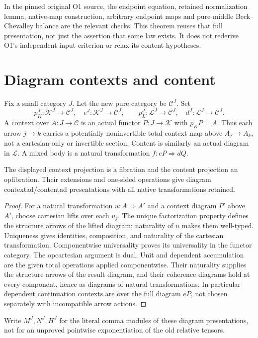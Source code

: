 \documentclass[11pt]{article}
\begin{document}
In the pinned original O1 source, the endpoint equation, retained normalization lemma, native-map construction, arbitrary endpoint maps and pure-middle Beck--Chevalley balance are the relevant checks. This theorem reuses that full presentation, not just the assertion that some law exists. It does not rederive O1's independent-input criterion or relax its content hypotheses.

\section{Diagram contexts and content}
Fix a small category $J$. Let the new pure category be $\mathcal C^J$. Set
\[
 p_K^J:\mathcal K^J\to\mathcal C^J,\quad e^J:\mathcal K^J\to\mathcal C^J,
 \qquad p_L^J:\mathcal L^J\to\mathcal C^J,\quad d^J:\mathcal L^J\to\mathcal C^J.
\]
A context over $A:J\to\mathcal C$ is an actual functor $P:J\to\mathcal K$ with $p_KP=A$. Thus each arrow $j\to k$ carries a potentially noninvertible total context map above $A_j\to A_k$, not a cartesian-only or invertible section. Content is similarly an actual diagram in $\mathcal L$. A mixed body is a natural transformation $f:eP\Rightarrow dQ$.

\begin{lemma}
The displayed context projection is a fibration and the content projection an opfibration. Their extensions and one-sided operations give diagram contextad/contentad presentations with all native transformations retained.
\end{lemma}
\begin{proof}
For a natural transformation $u:A\Rightarrow A'$ and a context diagram $P'$ above $A'$, choose cartesian lifts over each $u_j$. The unique factorization property defines the structure arrows of the lifted diagram; naturality of $u$ makes them well-typed. Uniqueness gives identities, composition, and naturality of the cartesian transformation. Componentwise universality proves its universality in the functor category. The opcartesian argument is dual. Unit and dependent accumulation are the given total operations applied componentwise. Their naturality supplies the structure arrows of the result diagram, and their coherence diagrams hold at every component, hence as diagrams of natural transformations. In particular dependent continuation contexts are over the full diagram $eP$, not chosen separately with incompatible arrow actions.
\end{proof}

Write $M^J,N^J,H^J$ for the literal comma modules of these diagram presentations, not for an unproved pointwise exponentiation of the old relative tensors.
\end{document}
